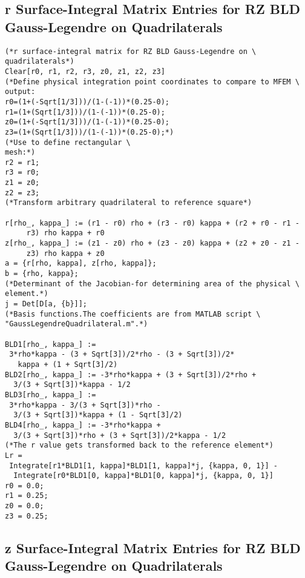 \documentclass{article}
\begin{document}
\subsection{r Surface-Integral Matrix Entries for RZ BLD Gauss-Legendre on Quadrilaterals}

\begin{verbatim}
(*r surface-integral matrix for RZ BLD Gauss-Legendre on \
quadrilaterals*)
Clear[r0, r1, r2, r3, z0, z1, z2, z3]
(*Define physical integration point coordinates to compare to MFEM \
output:
r0=(1+(-Sqrt[1/3]))/(1-(-1))*(0.25-0);
r1=(1+(Sqrt[1/3]))/(1-(-1))*(0.25-0);
z0=(1+(-Sqrt[1/3]))/(1-(-1))*(0.25-0);
z3=(1+(Sqrt[1/3]))/(1-(-1))*(0.25-0);*)
(*Use to define rectangular \
mesh:*)
r2 = r1;
r3 = r0;
z1 = z0;
z2 = z3;
(*Transform arbitrary quadrilateral to reference square*)

r[rho_, kappa_] := (r1 - r0) rho + (r3 - r0) kappa + (r2 + r0 - r1 - 
     r3) rho kappa + r0
z[rho_, kappa_] := (z1 - z0) rho + (z3 - z0) kappa + (z2 + z0 - z1 - 
     z3) rho kappa + z0
a = {r[rho, kappa], z[rho, kappa]};
b = {rho, kappa};
(*Determinant of the Jacobian-for determining area of the physical \
element.*)
j = Det[D[a, {b}]];
(*Basis functions.The coefficients are from MATLAB script \
"GaussLegendreQuadrilateral.m".*)

BLD1[rho_, kappa_] := 
 3*rho*kappa - (3 + Sqrt[3])/2*rho - (3 + Sqrt[3])/2*
   kappa + (1 + Sqrt[3]/2)
BLD2[rho_, kappa_] := -3*rho*kappa + (3 + Sqrt[3])/2*rho + 
  3/(3 + Sqrt[3])*kappa - 1/2
BLD3[rho_, kappa_] := 
 3*rho*kappa - 3/(3 + Sqrt[3])*rho - 
  3/(3 + Sqrt[3])*kappa + (1 - Sqrt[3]/2)
BLD4[rho_, kappa_] := -3*rho*kappa + 
  3/(3 + Sqrt[3])*rho + (3 + Sqrt[3])/2*kappa - 1/2
(*The r value gets transformed back to the reference element*)
Lr = 
 Integrate[r1*BLD1[1, kappa]*BLD1[1, kappa]*j, {kappa, 0, 1}] - 
  Integrate[r0*BLD1[0, kappa]*BLD1[0, kappa]*j, {kappa, 0, 1}]
r0 = 0.0;
r1 = 0.25;
z0 = 0.0;
z3 = 0.25;
\end{verbatim}

\subsection{z Surface-Integral Matrix Entries for RZ BLD Gauss-Legendre on Quadrilaterals}
\end{document}
